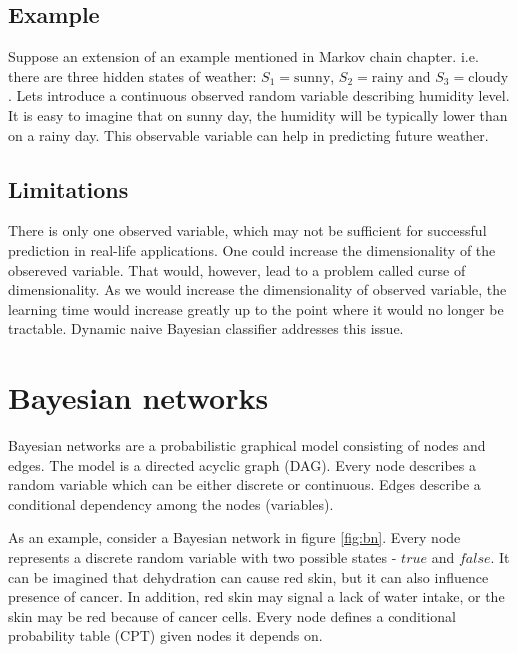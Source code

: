 \documentclass[thesis=B,english]{FITthesis}[2012/06/26]
\begin{document}
\subsection{Example}
Suppose an extension of an example mentioned in Markov chain chapter. i.e. there are three hidden states of weather: $S_1 = \text{sunny}$, $S_2 = \text{rainy}$ and $S_3 = \text{cloudy}$. Lets introduce a continuous observed random variable describing humidity level. It is easy to imagine that on sunny day, the humidity will be typically lower than on a rainy day. This observable variable can help in predicting future weather.

\subsection{Limitations}
There is only one observed variable, which may not be sufficient for successful prediction in real-life applications. One could increase the dimensionality of the obsereved variable. That would, however, lead to a problem called curse of dimensionality. As we would increase the dimensionality of observed variable, the learning time would increase greatly up to the point where it would no longer be tractable. Dynamic naive Bayesian classifier addresses this issue.

\section{Bayesian networks}

Bayesian networks are a probabilistic graphical model consisting of nodes and edges. The model is a directed acyclic graph (DAG). Every node describes a random variable which can be either discrete or continuous. Edges describe a conditional dependency among the nodes (variables).

As an example, consider a Bayesian network in figure \ref{fig:bn}. Every node represents a discrete random variable with two possible states - $true$ and $false$. It can be imagined that dehydration can cause red skin, but it can also influence presence of cancer. In addition, red skin may signal a lack of water intake, or the skin may be red because of cancer cells. Every node defines a conditional probability table (CPT) given nodes it depends on.
\end{document}
